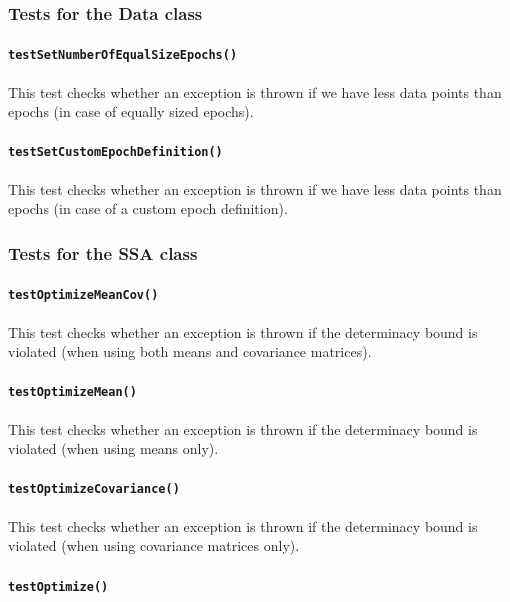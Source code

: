 \documentclass{article}
\newcommand{\1}{\ensuremath{\mathds{1}}}
\newcommand{\0}{\ensuremath{0}}
\begin{document}
\subsubsection*{Tests for the Data class}

\paragraph{\texttt{testSetNumberOfEqualSizeEpochs()}}

This test checks whether an exception is thrown if we have less data points than epochs (in case of equally sized epochs).

\paragraph{\texttt{testSetCustomEpochDefinition()}}

This test checks whether an exception is thrown if we have less data points than epochs (in case of a custom epoch definition).

\subsubsection*{Tests for the SSA class}

\paragraph{\texttt{testOptimizeMeanCov()}}

This test checks whether an exception is thrown if the determinacy bound is violated (when using both means and covariance matrices).

\paragraph{\texttt{testOptimizeMean()}}

This test checks whether an exception is thrown if the determinacy bound is violated (when using means only).

\paragraph{\texttt{testOptimizeCovariance()}}

This test checks whether an exception is thrown if the determinacy bound is violated (when using covariance matrices only).

\paragraph{\texttt{testOptimize()}}
\end{document}
